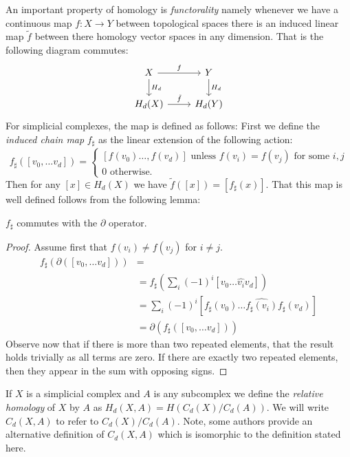 An important property of homology is \emph{functorality} namely whenever we have a continuous map $f: X \rightarrow Y$ between topological spaces there is an induced linear map $\tilde{f}$ between there homology vector spaces in any dimension. That is the following diagram commutes:
\[ \begin{tikzcd}
X \arrow{r}{f}\arrow{d}{H_d} & Y \arrow{d}{H_d} \\
H_d(X) \arrow{r}{\tilde{f}} & H_d(Y)
\end{tikzcd} \]
For simplicial complexes, the map is defined as follows: First we define the \emph{induced chain map} $f_\sharp$ as the linear extension of the following action: 
\[ f_\sharp([v_0, \ldots v_d]) = 
\begin{cases} 
    [f(v_0) \ldots, f(v_d)] \textrm{ unless } f(v_i) = f(v_j) \textrm{ for some } i,j \\
    0 \textrm{ otherwise. }
   \end{cases}
\]
Then for any $[x] \in H_d(X)$ we have $\tilde{f}([x]) = [f_{\sharp}(x)]$.  That this map is well defined follows from 
the following lemma:
\begin{lemma}
$f_\sharp$ commutes with the $\partial$ operator. 
\end{lemma}
\begin{proof}
Assume first that $f(v_i) \neq f(v_j)$ for $i \neq j$.
\begin{align*}
f_\sharp(\partial([v_0, \ldots v_d])) &= \\
&= f_{\sharp}(\sum_i (-1)^i[v_0 \ldots \hat{v_i} v_d])  \\
&=  \sum_i(-1)^i [f_{\sharp}(v_0) \ldots \hat{f_{\sharp}(v_i)} f_{\sharp}(v_d)] \\
&=  \partial(f_\sharp([v_0, \ldots v_d]))
\end{align*}
Observe now that if there is more than two repeated elements, that the result holds trivially as all terms are zero. If there are exactly two repeated elements, then they appear
in the sum with opposing signs.
\end{proof}

If $X$ is a simplicial complex and $A$ is any subcomplex we define the \emph{relative homology} of $X$ by $A$ as $H_d(X,A) = H(C_d(X)/C_d(A))$. We will write $C_d(X,A)$ to refer to $C_d(X)/C_d(A)$. Note, some authors provide an alternative definition of $C_d(X,A)$ which is isomorphic to the definition stated here.


